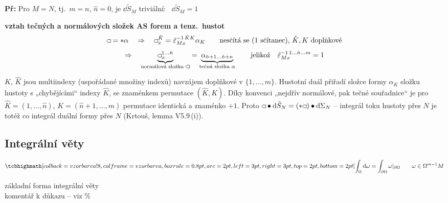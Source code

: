 \textbf{Př:} Pro $M = N$, tj.\ $m = n$, $\hat n = 0$, je $\dd\tilde S_M$ triviální: \ $\dd\tilde S_M = 1$

\textbf{vztah tečných a normálových složek AS forem a tenz.\ hustot}
\[
  \gmIpatnactHust = {*}\alpha \quad\Rightarrow\quad
  \gmIpatnactHust_x^{\hat K} = \tilde\varepsilon_{Mx}^{-1\,\hat KK}\alpha_K
  \qquad\text{nesčítá se (1 sčítanec), } \hat K, K \text{ doplňkové}
\]
\[
  \Rightarrow\quad
  \underbrace{\gmIpatnactHust_x^{1\ldots\hat n}}_{\text{normálová složka }\gmIpatnactHust} =
  \underbrace{\alpha_{\hat n+1\ldots\hat n+n}}_{\text{tečná složka }\alpha}
  \qquad\text{jelikož}\quad \tilde\varepsilon_{Mx}^{-1\,1\ldots\hat n\ldots m} = 1
\]

\begin{vysvetleni}[Proč normálová složka = tečná složka]
$K$, $\hat K$ jsou multiindexy (uspořádané množiny indexů) navzájem doplňkové v $\{1,\ldots,m\}$. Hustotní duál přiřadí složce formy $\alpha_K$ složku hustoty s „chybějícími“ indexy $\hat K$, se znaménkem permutace $(\hat K,K)$. Díky konvenci „nejdřív normálové, pak tečné souřadnice“ je pro $\hat K=(1,\ldots,\hat n)$, $K=(\hat n+1,\ldots,m)$ permutace identická a znaménko $+1$. Proto $\gmIpatnactHust\bullet\dd\tilde S_N=({*}\gmIpatnactHust)\bullet\dd\Sigma_N$ -- integrál toku hustoty přes $N$ je totéž co integrál duální formy přes $N$ (Krtouš, lemma V5.9\,(i)).
\end{vysvetleni}

\subsection{Integrální věty}

\begin{minipage}{0.68\textwidth}
\begin{veta}
\[
  \vzorec{\int_\Omega\dd\omega = \int_{\partial\Omega}\omega|_{\partial\Omega}}
  \qquad \omega\in\Omega^{m-1}M
\]
\end{veta}
základní forma integrální věty \\
komentář k důkazu -- viz \% 
\end{minipage}
\begin{minipage}{0.3\textwidth}
\centering
{}
\end{minipage}

